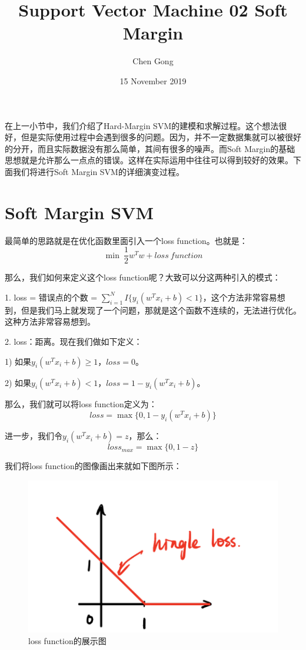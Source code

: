 \documentclass[a4paper]{article}
\title{Support Vector Machine 02 Soft Margin}
\author{Chen Gong}
\date{15 November 2019}
\begin{document}
\maketitle

在上一小节中，我们介绍了Hard-Margin SVM的建模和求解过程。这个想法很好，但是实际使用过程中会遇到很多的问题。因为，并不一定数据集就可以被很好的分开，而且实际数据没有那么简单，其间有很多的噪声。而Soft Margin的基础思想就是允许那么一点点的错误。这样在实际运用中往往可以得到较好的效果。下面我们将进行Soft Margin SVM的详细演变过程。

\section{Soft Margin SVM}
最简单的思路就是在优化函数里面引入一个loss function。也就是：
\begin{equation}
    \min \ \frac{1}{2}w^Tw + loss \ function
\end{equation}

那么，我们如何来定义这个loss function呢？大致可以分这两种引入的模式：

1. loss = 错误点的个数 = $\sum_{i=1}^NI\{y_i(w^Tx_i+b)<1\}$，这个方法非常容易想到，但是我们马上就发现了一个问题，那就是这个函数不连续的，无法进行优化。这种方法非常容易想到。

2. loss：距离。现在我们做如下定义：

1) 如果$y_i(w^Tx_i+b)\geq 1$，$loss = 0$。

2) 如果$y_i(w^Tx_i+b)< 1$，$loss = 1-y_i(w^Tx_i+b)$。

那么，我们就可以将loss function定义为：
\begin{equation}
    loss = \max\{ 0, 1-y_i(w^Tx_i+b) \}
\end{equation}

进一步，我们令$y_i(w^Tx_i+b)=z$，那么：
\begin{equation}
    loss_{max} = \max\{ 0, 1-z \}
\end{equation}

我们将loss function的图像画出来就如下图所示：
\begin{figure}[H]
    \centering
    \includegraphics[width=.4\textwidth]{微信图片_20191115131201.png}
    \caption{loss function的展示图}
    \label{fig:my_label_1}
\end{figure}
\end{document}
